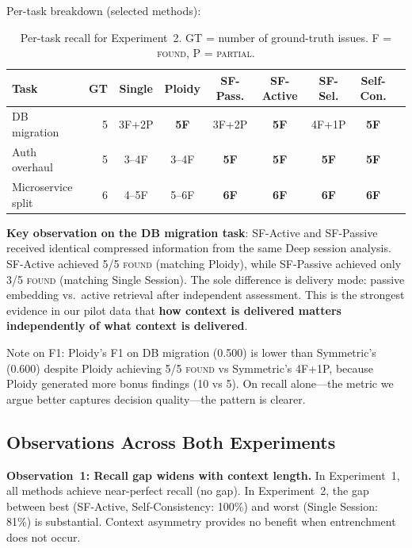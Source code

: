 \documentclass[11pt]{article}
\begin{document}
Per-task breakdown (selected methods):

\begin{table}[t]
\centering
\caption{Per-task recall for Experiment~2. GT = number of ground-truth issues. F = \textsc{found}, P = \textsc{partial}.}
\label{tab:exp2-pertask}
\small
\begin{tabular}{@{}lr ccccccc@{}}
\toprule
\textbf{Task} & \textbf{GT} & \textbf{Single} & \textbf{Ploidy} & \textbf{SF-Pass.} & \textbf{SF-Active} & \textbf{SF-Sel.} & \textbf{Self-Con.} \\
\midrule
DB migration       & 5 & 3F+2P          & \textbf{5F} & 3F+2P          & \textbf{5F} & 4F+1P          & \textbf{5F} \\
Auth overhaul      & 5 & 3--4F          & 3--4F       & \textbf{5F}    & \textbf{5F} & \textbf{5F}    & \textbf{5F} \\
Microservice split & 6 & 4--5F          & 5--6F       & \textbf{6F}    & \textbf{6F} & \textbf{6F}    & \textbf{6F} \\
\bottomrule
\end{tabular}
\end{table}

\textbf{Key observation on the DB migration task}: SF-Active and SF-Passive received identical compressed information from the same Deep session analysis. SF-Active achieved 5/5 \textsc{found} (matching Ploidy), while SF-Passive achieved only 3/5 \textsc{found} (matching Single Session). The sole difference is delivery mode: passive embedding vs.\ active retrieval after independent assessment. This is the strongest evidence in our pilot data that \textbf{how context is delivered matters independently of what context is delivered}.

Note on F1: Ploidy's F1 on DB migration (0.500) is lower than Symmetric's (0.600) despite Ploidy achieving 5/5 \textsc{found} vs Symmetric's 4F+1P, because Ploidy generated more bonus findings (10 vs 5). On recall alone---the metric we argue better captures decision quality---the pattern is clearer.

\subsection{Observations Across Both Experiments}
\label{sec:cross-observations}

\textbf{Observation~1: Recall gap widens with context length.} In Experiment~1, all methods achieve near-perfect recall (no gap). In Experiment~2, the gap between best (SF-Active, Self-Consistency: 100\%) and worst (Single Session: 81\%) is substantial. Context asymmetry provides no benefit when entrenchment does not occur.
\end{document}
